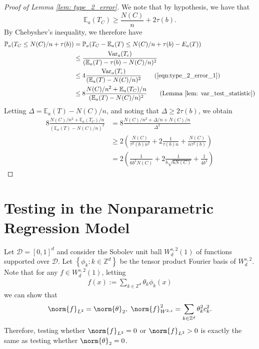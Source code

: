 \documentclass{article}
\newcommand{\set}[1]{\left\{#1\right\}}
\newcommand{\Var}{\mathrm{Var}}
\newcommand{\1}{\mathbb{I}}
\newcommand{\Pbb}{\mathbb{P}}
\newcommand{\Ebb}{\mathbb{E}}
\theoremstyle{alden}
\theoremstyle{aldenthm}
\theoremstyle{definition}
\theoremstyle{remark}
\begin{document}
\begin{proof}[Proof of Lemma \ref{lem: type_2_error}]
	We note that by hypothesis, we have that
	\begin{equation}
	\label{eqn:type_2_error_1}
	\Ebb_a(T_C) \geq \frac{N(C)}{n} + 2\tau(b).
	\end{equation}
	By Chebyshev's inequality, we therefore have
	\begin{align*}
	\Pbb_{a}(T_C \leq N(C)/n + \tau(b)) & = \Pbb_{a}(T_C - \Ebb_a(T) \leq N(C)/n + \tau(b) - E_a(T)) \\
	& \leq \frac{\Var_a(T_c)}{(\Ebb_a(T) - \tau(b) - N(C)/n)^2} \\
	& \leq 4\frac{\Var_a(T_c)}{(\Ebb_a(T) - N(C)/n)^2} \tag{\ref{eqn:type_2_error_1}}\\
	& \leq 8\frac{N(C)/n^2 + \Ebb_a(T_C)/n}{(\Ebb_a(T) - N(C)/n)^2} \tag{Lemma \ref{lem: var_test_statistic}} \\
	\end{align*}
	Letting $\Delta = \Ebb_a(T) - N(C)/n$, and noting that $\Delta \geq 2\tau(b)$, we obtain
	\begin{align*}
	8\frac{N(C)/n^2 + \Ebb_a(T_C)/n}{(\Ebb_a(T) - N(C)/n)^2} & = 8 \frac{N(C)/n^2 + \Delta/n + N(C)/n}{\Delta^2} \\
	& \geq 2 \left(\frac{N(C)}{\tau^2(b)n^2} + 2\frac{1}{\tau(b) n} + \frac{N(C)}{n\tau^2(b)}\right) \\
	& = 2 \left(\frac{1}{6b^2N(C)} + 2\frac{1}{b\sqrt{6N(C)}} +  \frac{1}{4b^2}\right)
	\end{align*}
\end{proof}

\section{Testing in the Nonparametric Regression Model}
Let $\mathcal{D} = [0,1]^d$ and consider the Sobolev unit ball $W^{s,2}_d(1)$ of functions supported over $\mathcal{D}$. Let $\set{\phi_k: k \in \mathbb{Z}^d}$ be the tensor product Fourier basis of $W^{s,2}_d$. Note that for any $f \in W^{s,2}_d(1)$, letting
\begin{align*}
f(x) := \sum_{k \in \mathbb{Z}^d} \theta_k \phi_k(x)
\end{align*}
we can show that
\begin{equation*}
\norm{f}_{L^2} = \norm{\theta}_{2}, ~ \norm{f}_{W^{2,s}}^2 = \sum_{k \in \mathbb{Z}^d} \theta_k^2 c_k^2.
\end{equation*}
Therefore, testing whether $\norm{f}_{L^2} = 0$ or $\norm{f}_{L^2} > 0$ is exactly the same as testing whether $\norm{\theta}_2 = 0$. 
\end{document}
